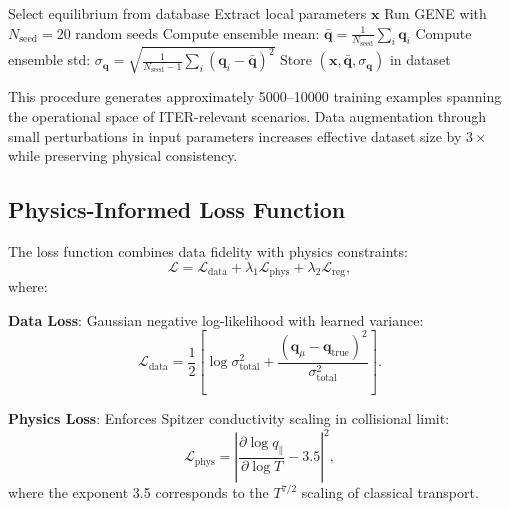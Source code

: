 \documentclass[12pt]{article}
\begin{document}
\begin{algorithm}[h]
\caption{Training Data Generation}
\begin{algorithmic}[1]
\State Select equilibrium from database
        \State Extract local parameters $\mathbf{x}$
        \State Run GENE with $N_{\text{seed}} = 20$ random seeds
        \State Compute ensemble mean: $\bar{\mathbf{q}} = \frac{1}{N_{\text{seed}}}\sum_i \mathbf{q}_i$
        \State Compute ensemble std: $\sigma_{\mathbf{q}} = \sqrt{\frac{1}{N_{\text{seed}}-1}\sum_i (\mathbf{q}_i - \bar{\mathbf{q}})^2}$
        \State Store $(\mathbf{x}, \bar{\mathbf{q}}, \sigma_{\mathbf{q}})$ in dataset
    \EndFor
\EndFor
\end{algorithmic}
\end{algorithm}

This procedure generates approximately \num{5000}--\num{10000} training examples spanning the operational space of ITER-relevant scenarios. Data augmentation through small perturbations in input parameters increases effective dataset size by $3\times$ while preserving physical consistency.

\subsection{Physics-Informed Loss Function}

The loss function combines data fidelity with physics constraints:
\begin{equation}
\mathcal{L} = \mathcal{L}_{\text{data}} + \lambda_1 \mathcal{L}_{\text{phys}} + \lambda_2 \mathcal{L}_{\text{reg}},
\label{eq:loss}
\end{equation}
where:

\textbf{Data Loss}: Gaussian negative log-likelihood with learned variance:
\begin{equation}
\mathcal{L}_{\text{data}} = \frac{1}{2}\left[\log\sigma_{\text{total}}^2 + \frac{(\mathbf{q}_\mu - \mathbf{q}_{\text{true}})^2}{\sigma_{\text{total}}^2}\right].
\end{equation}

\textbf{Physics Loss}: Enforces Spitzer conductivity scaling in collisional limit:
\begin{equation}
\mathcal{L}_{\text{phys}} = \left|\frac{\partial \log q_\parallel}{\partial \log T} - 3.5\right|^2,
\end{equation}
where the exponent 3.5 corresponds to the $T^{7/2}$ scaling of classical transport.
\end{document}

